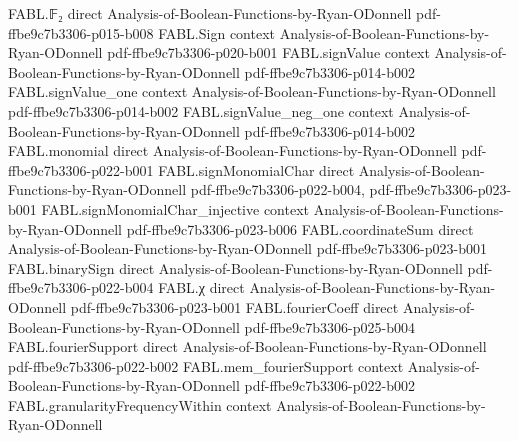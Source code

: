 \begin{theorem}
\leanok
{}
\proofstep
  {FABL.𝔽₂}
  {direct}
  {Analysis-of-Boolean-Functions-by-Ryan-ODonnell}
  {pdf-ffbe9c7b3306-p015-b008}
\proofstep
  {FABL.Sign}
  {context}
  {Analysis-of-Boolean-Functions-by-Ryan-ODonnell}
  {pdf-ffbe9c7b3306-p020-b001}
\proofstep
  {FABL.signValue}
  {context}
  {Analysis-of-Boolean-Functions-by-Ryan-ODonnell}
  {pdf-ffbe9c7b3306-p014-b002}
\proofstep
  {FABL.signValue_one}
  {context}
  {Analysis-of-Boolean-Functions-by-Ryan-ODonnell}
  {pdf-ffbe9c7b3306-p014-b002}
\proofstep
  {FABL.signValue_neg_one}
  {context}
  {Analysis-of-Boolean-Functions-by-Ryan-ODonnell}
  {pdf-ffbe9c7b3306-p014-b002}
\proofstep
  {FABL.monomial}
  {direct}
  {Analysis-of-Boolean-Functions-by-Ryan-ODonnell}
  {pdf-ffbe9c7b3306-p022-b001}
\proofstep
  {FABL.signMonomialChar}
  {direct}
  {Analysis-of-Boolean-Functions-by-Ryan-ODonnell}
  {pdf-ffbe9c7b3306-p022-b004,
    pdf-ffbe9c7b3306-p023-b001}
\proofstep
  {FABL.signMonomialChar_injective}
  {context}
  {Analysis-of-Boolean-Functions-by-Ryan-ODonnell}
  {pdf-ffbe9c7b3306-p023-b006}
\proofstep
  {FABL.coordinateSum}
  {direct}
  {Analysis-of-Boolean-Functions-by-Ryan-ODonnell}
  {pdf-ffbe9c7b3306-p023-b001}
\proofstep
  {FABL.binarySign}
  {direct}
  {Analysis-of-Boolean-Functions-by-Ryan-ODonnell}
  {pdf-ffbe9c7b3306-p022-b004}
\proofstep
  {FABL.χ}
  {direct}
  {Analysis-of-Boolean-Functions-by-Ryan-ODonnell}
  {pdf-ffbe9c7b3306-p023-b001}
\proofstep
  {FABL.fourierCoeff}
  {direct}
  {Analysis-of-Boolean-Functions-by-Ryan-ODonnell}
  {pdf-ffbe9c7b3306-p025-b004}
\proofstep
  {FABL.fourierSupport}
  {direct}
  {Analysis-of-Boolean-Functions-by-Ryan-ODonnell}
  {pdf-ffbe9c7b3306-p022-b002}
\proofstep
  {FABL.mem_fourierSupport}
  {context}
  {Analysis-of-Boolean-Functions-by-Ryan-ODonnell}
  {pdf-ffbe9c7b3306-p022-b002}
\proofstep
  {FABL.granularityFrequencyWithin}
  {context}
  {Analysis-of-Boolean-Functions-by-Ryan-ODonnell}

\end{theorem}
